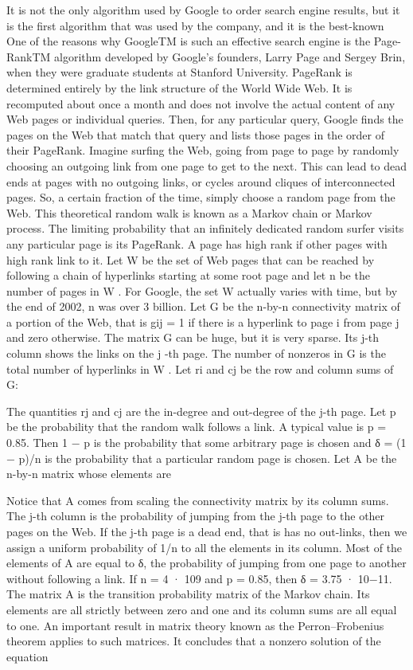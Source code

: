 \documentclass[12 pt]{article}
\begin{document}
It is not the only algorithm used by Google to order search engine results, but it is the first algorithm that was used by the company, and it is the best-known
One of the reasons why GoogleTM is such an effective search engine is the Page-RankTM algorithm developed by Google’s founders, Larry Page and Sergey Brin, when they were graduate students at Stanford University. PageRank is determined entirely by the link structure of the World Wide Web. It is recomputed about once a month and does not involve the actual content of any Web pages or individual queries. Then, for any particular query, Google finds the pages on the Web that match that query and lists those pages in the order of their PageRank. Imagine surfing the Web, going from page to page by randomly choosing an outgoing link from one page to get to the next. This can lead to dead ends at pages with no outgoing links, or cycles around cliques of interconnected pages. So, a certain fraction of the time, simply choose a random page from the Web. This theoretical random walk is known as a Markov chain or Markov process. The limiting probability that an infinitely dedicated random surfer visits any particular page is its PageRank. A page has high rank if other pages with high rank link to it.
Let W be the set of Web pages that can be reached by following a chain of hyperlinks starting at some root page and let n be the number of pages in W . For Google, the set W actually varies with time, but by the end of 2002, n was over 3 billion. Let G be the n-by-n connectivity matrix of a portion of the Web, that is gij = 1 if there is a hyperlink to page i from page j and zero otherwise. The matrix G can be huge, but it is very sparse. Its j-th column shows the links on the j -th page. The number of nonzeros in G is the total number of hyperlinks in W .
Let ri and cj be the row and column sums of G:

The quantities rj and cj are the in-degree and out-degree of the j-th page. Let p be the probability that the random walk follows a link. A typical value is p = 0.85. Then 1 − p is the probability that some arbitrary page is chosen and δ = (1 − p)/n is the probability that a particular random page is chosen. Let A be the n-by-n matrix whose elements are

Notice that A comes from scaling the connectivity matrix by its column sums. The j-th column is the probability of jumping from the j-th page to the other pages on the Web. If the j-th page is a dead end, that is has no out-links, then we assign a uniform probability of 1/n to all the elements in its column. Most of the elements of A are equal to δ, the probability of jumping from one page to another without following a link. If n = 4 · 109 and p = 0.85, then δ = 3.75 · 10−11. The matrix A is the transition probability matrix of the Markov chain. Its elements are all strictly between zero and one and its column sums are all equal to one. An important result in matrix theory known as the Perron–Frobenius theorem applies to such matrices. It concludes that a nonzero solution of the equation
\end{document}
